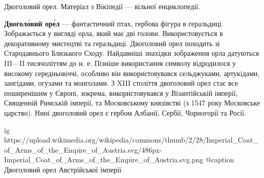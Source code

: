  
 
 
 
 

\raggedcolumns
\begin{multicols}{2} %
\setlength{\parindent}{0pt}

Двоголовий орел. Матеріал з Вікіпедії — вільної енциклопедії.

\textbf{Двоголо́вий оре́л} — фантастичний птах, гербова фігура в геральдиці. Зображається
у вигляді орла, який має дві голови. Використовується в декоративному мистецтві
та геральдиці. Двоголовий орел походить зі Стародавнього Близького Сходу.
Найдавніші знахідки зображення орла датуються III—II тисячоліттям до н. е.
Пізніше використання символу відродилося у високому середньовіччі, особливо він
використовувався сельджуками, артукідами, зангідами, огузами та монголами. З
XIII століття двоголовий орел стає все поширенішим у Європі, зокрема,
використовувався у Візантійській імперії, Священній Римській імперії, та
Московському князівстві (з 1547 року Московське царство). Нині двоголовий орел
є гербом Албанії, Сербії, Чорногорії та Росії.

\ifcmt
  ig https://upload.wikimedia.org/wikipedia/commons/thumb/2/28/Imperial_Coat_of_Arms_of_the_Empire_of_Austria.svg/486px-Imperial_Coat_of_Arms_of_the_Empire_of_Austria.svg.png
	@caption Двоголовий орел Австрійської імперії
\fi


\end{multicols}
